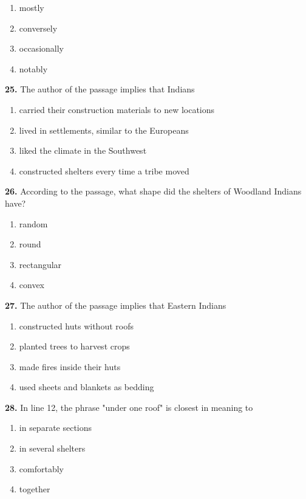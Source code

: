 \documentclass[12pt]{article}
\begin{document}
\begin{enumerate}[label=(\Alph*),leftmargin=*,itemsep=0.2em]
\item mostly
\item conversely
\item occasionally
\item notably
\end{enumerate}
\par
\vspace{0.25\baselineskip}
\noindent\textbf{25.} The author of the passage implies that Indians
\begin{enumerate}[label=(\Alph*),leftmargin=*,itemsep=0.2em]
\item carried their construction materials to new locations
\item lived in settlements, similar to the Europeans
\item liked the climate in the Southwest
\item constructed shelters every time a tribe moved
\end{enumerate}
\par
\vspace{0.25\baselineskip}
\noindent\textbf{26.} According to the passage, what shape did the shelters of Woodland Indians have?
\begin{enumerate}[label=(\Alph*),leftmargin=*,itemsep=0.2em]
\item random
\item round
\item rectangular
\item convex
\end{enumerate}
\par
\vspace{0.25\baselineskip}
\noindent\textbf{27.} The author of the passage implies that Eastern Indians
\begin{enumerate}[label=(\Alph*),leftmargin=*,itemsep=0.2em]
\item constructed huts without roofs
\item planted trees to harvest crops
\item made fires inside their huts
\item used sheets and blankets as bedding
\end{enumerate}
\par
\vspace{0.25\baselineskip}
\noindent\textbf{28.} In line 12, the phrase "under one roof" is closest in meaning to
\begin{enumerate}[label=(\Alph*),leftmargin=*,itemsep=0.2em]
\item in separate sections
\item in several shelters
\item comfortably
\item together
\end{enumerate}
\end{document}
